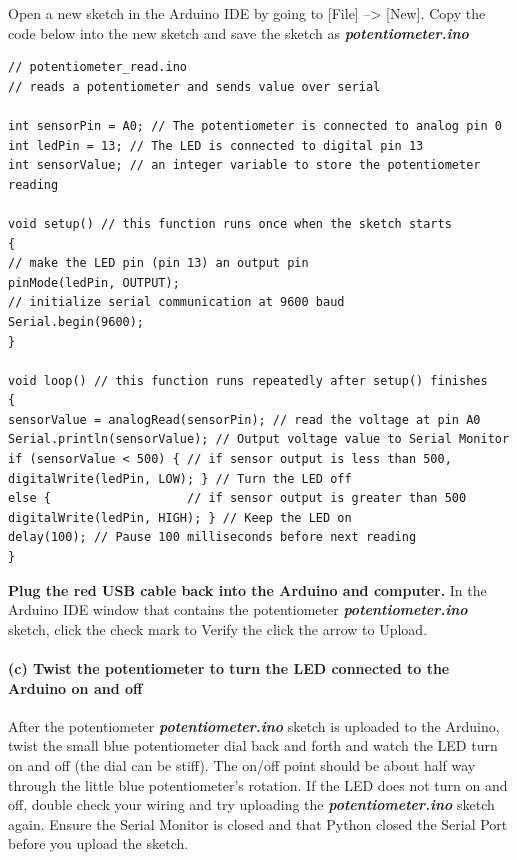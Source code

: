 Open a new sketch in the Arduino IDE by going to {[}File{]}
--\textgreater{} {[}New{]}. Copy the code below into the new sketch and
save the sketch as \textbf{\emph{potentiometer.ino}}

\begin{verbatim}
// potentiometer_read.ino
// reads a potentiometer and sends value over serial

int sensorPin = A0; // The potentiometer is connected to analog pin 0
int ledPin = 13; // The LED is connected to digital pin 13
int sensorValue; // an integer variable to store the potentiometer reading

void setup() // this function runs once when the sketch starts
{
// make the LED pin (pin 13) an output pin
pinMode(ledPin, OUTPUT);
// initialize serial communication at 9600 baud
Serial.begin(9600);
}

void loop() // this function runs repeatedly after setup() finishes
{
sensorValue = analogRead(sensorPin); // read the voltage at pin A0
Serial.println(sensorValue); // Output voltage value to Serial Monitor
if (sensorValue < 500) { // if sensor output is less than 500,
digitalWrite(ledPin, LOW); } // Turn the LED off
else {                   // if sensor output is greater than 500
digitalWrite(ledPin, HIGH); } // Keep the LED on
delay(100); // Pause 100 milliseconds before next reading
}
\end{verbatim}

\textbf{Plug the red USB cable back into the Arduino and computer.} In
the Arduino IDE window that contains the potentiometer
\textbf{\emph{potentiometer.ino}} sketch, click the check mark to Verify
the click the arrow to Upload.

    \hypertarget{c-twist-the-potentiometer-to-turn-the-led-connected-to-the-arduino-on-and-off}{%
\paragraph{(c) Twist the potentiometer to turn the LED connected to the
Arduino on and
off}\label{c-twist-the-potentiometer-to-turn-the-led-connected-to-the-arduino-on-and-off}}

After the potentiometer \textbf{\emph{potentiometer.ino}} sketch is
uploaded to the Arduino, twist the small blue potentiometer dial back
and forth and watch the LED turn on and off (the dial can be stiff). The
on/off point should be about half way through the little blue
potentiometer's rotation. If the LED does not turn on and off, double
check your wiring and try uploading the
\textbf{\emph{potentiometer.ino}} sketch again. Ensure the Serial
Monitor is closed and that Python closed the Serial Port before you
upload the sketch.

